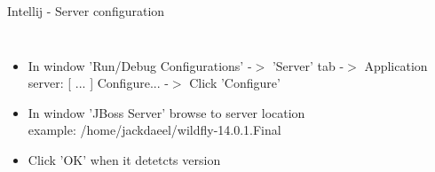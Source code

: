 \documentclass[aspectratio=1610,english]{beamer} %
\begin{document}
\begin{frame}{Intellij - Server configuration}
\begin{columns}
			
				\begin{minipage}{\textwidth}
				\end{minipage}
				
				\begin{itemize}
					\tiny
					\color{black}
					\item In window 'Run/Debug Configurations' -$>$ 'Server' tab -$>$ Application server: [ ... ] Configure... -$>$ Click 'Configure'
					\item In window 'JBoss Server' browse to server location \\
						\color{gray}
						\fontsize{4}{5} \selectfont 
						example: /home/jackdaeel/wildfly-14.0.1.Final
					\color{black}
					\tiny
					\item Click 'OK' when it detetcts version
				\end{itemize}
		\end{columns}
	\end{frame}
\end{document}
